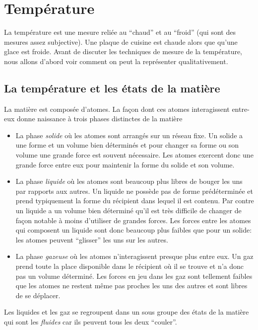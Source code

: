 \documentclass[a4paper,12pt]{book}
\begin{document}
\chapter{Température}

La température est une mesure reliée au ``chaud'' et au ``froid'' (qui sont des mesures assez subjective). Une plaque de cuisine est chaude alors que 
qu'une glace est froide. Avant de discuter les techniques de mesure de la température, nous allons d'abord voir comment on peut la représenter qualitativement.

\section{La température et les états de la matière}

La matière est composée d'atomes. La façon dont ces atomes interagissent entre-eux donne naissance à
trois phases distinctes de la matière
\begin{itemize}
 \item La phase \textit{solide} où les atomes sont arrangés sur un réseau fixe. Un solide a une forme et un volume bien déterminés et pour
 changer sa forme ou son volume une grande force est souvent nécessaire. Les atomes exercent donc une grande force entre eux pour maintenir 
 la forme du solide et son volume.
 \item La phase \textit{liquide} où les atomes sont beaucoup plus libres de bouger les uns par rapports aux autres. Un liquide ne possède pas
 de forme prédéterminée et prend typiquement la forme du récipient dans lequel il est contenu. Par contre un liquide a un volume bien déterminé
 qu'il est très difficile de changer de façon notable à moins d'utiliser de grandes forces. 
 Les forces entre les atomes qui composent un liquide sont donc beaucoup
 plus faibles que pour un solide: les atomes peuvent ``glisser'' les uns sur les autres.
 \item La phase \textit{gazeuse} où les atomes n’interagissent presque plus entre eux. Un gaz prend toute la place disponible dans le récipient où il se trouve
 et n'a donc pas un volume déterminé. Les forces en jeu dans les gaz sont tellement faibles que les atomes ne restent même pas proches les uns
 des autres et sont libres de se déplacer.
\end{itemize}
Les liquides et les gaz se regroupent dans un sous groupe des états de la matière qui sont les \textit{fluides} car ils peuvent tous les deux ``couler''.
\end{document}
